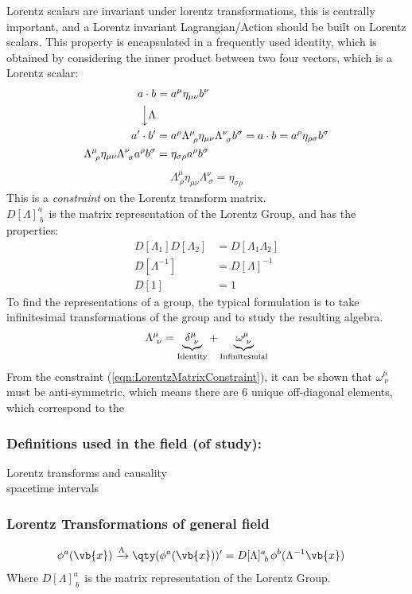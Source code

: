 Lorentz scalars are invariant under lorentz transformations, this is centrally important, and a Lorentz invariant Lagrangian/Action should be built on Lorentz scalars. This property is encapsulated in a 
frequently used identity, which is obtained by considering the inner product between two four vectors, which is a Lorentz scalar:
\begin{align*}
	a\cdot b&=a^{\mu}\eta_{\mu\nu}b^{\nu}
	\\
	\Big\downarrow\Lambda& \notag \\
	a^{\prime}\cdot b^{\prime}&=a^{\rho}\Lambda^{\mu}_{~\rho}\eta_{\mu\nu} \Lambda^{\nu}_{~\sigma}b^{\sigma}=a\cdot b=a^{\rho}\eta_{\rho\sigma}b^{\sigma}
	\\
	\Lambda^{\mu}_{~\rho}\eta_{\mu\nu} \Lambda^{\nu}_{~\sigma}a^{\rho}b^{\sigma}&=\eta_{\sigma\rho}a^{\rho}b^{\sigma}
\end{align*}
\begin{align}		
	\boxed{\Lambda^{\mu}_{~\rho}\eta_{\mu\nu} \Lambda^{\nu}_{~\sigma}=\eta_{\sigma\rho}}\label{eqn:LorentzMatrixConstraint}
\end{align}
This is a \emph{constraint} on the Lorentz transform matrix.
\\
\(D[\Lambda]^{a}_{~b\,}\) is the matrix representation of the Lorentz Group, and has the properties:
\begin{align*}
	D[\Lambda_1]D[\Lambda_2]&=D[\Lambda_1\Lambda_2]
	\\
	D[\Lambda^{-1}]&=D[\Lambda]^{-1}
	\\
	D[1]&=1
\end{align*}
To find the representations of a group, the typical formulation is to take infinitesimal transformations of the group and to study the resulting algebra. 
\begin{align*}
	\Lambda^{\mu}_{~\nu}=\underbrace{\delta^{\mu}_{~\nu}}_{\rm Identity}+\underbrace{\omega^{\mu}_{~\nu}}_{\rm Infinitesmial}
\end{align*}
From the constraint (\ref{eqn:LorentzMatrixConstraint}), it can be shown that \(\omega^{\mu}_{~\nu}\) must be anti-symmetric, which means there are 6 unique off-diagonal elements, which correspond to the 
\subsubsection{Definitions used in the field (of study):}
Lorentz transforms and causality
\\
spacetime intervals

\subsubsection{Lorentz Transformations of general field}
\begin{align}
	\phi^{a}(\vb{x})&\xrightarrow{\Lambda}\qty(\phi^{a}(\vb{x}))^{\prime}=D[\Lambda]^{a}_{~b\,}\phi^{b}(\Lambda^{-1}\vb{x})
\end{align}
Where \(D[\Lambda]^{a}_{~b\,}\) is the matrix representation of the Lorentz Group.

